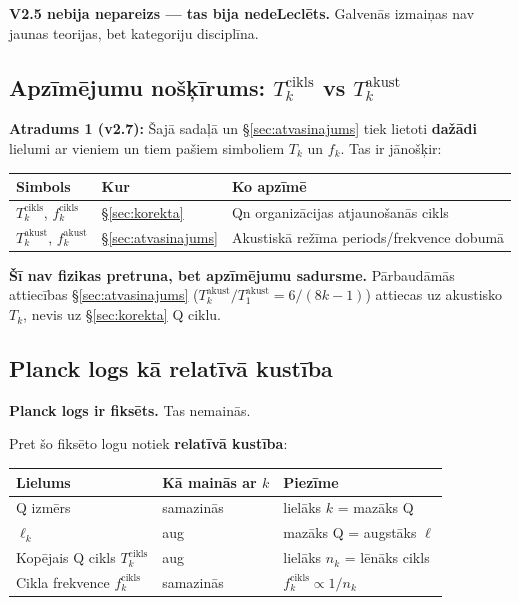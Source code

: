 \documentclass[12pt,a4paper]{article}
\begin{document}
\textbf{V2.5 nebija nepareizs — tas bija nedeLeclēts.} Galvenās izmaiņas nav jaunas teorijas, bet kategoriju disciplīna.

\subsection*{Apzīmējumu nošķīrums: $T_k^{\text{cikls}}$ vs $T_k^{\text{akust}}$}

\textbf{Atradums 1 (v2.7):} Šajā sadaļā un \S\ref{sec:atvasinajums} tiek lietoti \textbf{dažādi} lielumi ar vieniem un tiem pašiem simboliem $T_k$ un $f_k$. Tas ir jānošķir:

\begin{table}[h]
\centering
\begin{tabular}{|l|l|l|}
\hline
\textbf{Simbols} & \textbf{Kur} & \textbf{Ko apzīmē} \\
\hline
$T_k^{\text{cikls}}$, $f_k^{\text{cikls}}$ & \S\ref{sec:korekta} & Qn organizācijas atjaunošanās cikls \\
$T_k^{\text{akust}}$, $f_k^{\text{akust}}$ & \S\ref{sec:atvasinajums} & Akustiskā režīma periods/frekvence dobumā \\
\hline
\end{tabular}
\end{table}

\textbf{Šī nav fizikas pretruna, bet apzīmējumu sadursme.} Pārbaudāmās attiecības \S\ref{sec:atvasinajums} ($T_k^{\text{akust}}/T_1^{\text{akust}} = 6/(8k-1)$) attiecas uz akustisko $T_k$, nevis uz \S\ref{sec:korekta} Q ciklu.

\subsection*{Planck logs kā relatīvā kustība}

\textbf{Planck logs ir fiksēts.} Tas nemainās.

Pret šo fiksēto logu notiek \textbf{relatīvā kustība}:

\begin{table}[h]
\centering
\begin{tabular}{|l|l|l|}
\hline
\textbf{Lielums} & \textbf{Kā mainās ar $k$} & \textbf{Piezīme} \\
\hline
Q izmērs & samazinās & lielāks $k$ = mazāks Q \\
$\ell_k$ & aug & mazāks Q = augstāks $\ell$ \\
Kopējais Q cikls $T_k^{\text{cikls}}$ & aug & lielāks $n_k$ = lēnāks cikls \\
Cikla frekvence $f_k^{\text{cikls}}$ & samazinās & $f_k^{\text{cikls}} \propto 1/n_k$ \\
\hline
\end{tabular}
\end{table}
\end{document}
